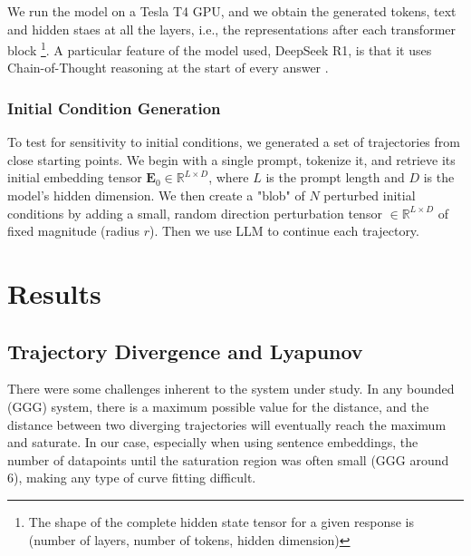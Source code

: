 \documentclass[a4paper,12pt]{article}
\begin{document}
We run the model on a Tesla T4 GPU, and we obtain the generated tokens, text and hidden staes at all the layers, i.e., the representations after each transformer block \footnote{The shape of the complete hidden state tensor for a given response is (number of layers, number of tokens, hidden dimension)}. A particular feature of the model used, DeepSeek R1, is that it uses Chain-of-Thought reasoning at the start of every answer \cite{deepseekR1}.

\subsubsection{Initial Condition Generation}
\label{subsec:init_cond_gen}
To test for sensitivity to initial conditions, we generated a set of trajectories from close starting points. We begin with a single prompt, tokenize it, and retrieve its initial embedding tensor $\mathbf{E}_0 \in \mathbb{R}^{L \times D}$, where $L$ is the prompt length and $D$ is the model's hidden dimension. We then create a "blob" of $N$ perturbed initial conditions by adding a small, random direction perturbation tensor $\in \mathbb{R}^{L \times D}$ of fixed magnitude (radius $r$). Then we use LLM to continue each trajectory.

\section{Results}
\label{sec:results}

\subsection{Trajectory Divergence and Lyapunov} \label{res:lyapunov} %

There were some challenges inherent to the system under study. In any bounded (GGG) system, there is a maximum possible value for the distance, and the distance between two diverging trajectories will eventually reach the maximum and saturate. In our case, especially when using sentence embeddings, the number of datapoints until the saturation region was often small (GGG around 6), making any type of curve fitting difficult.
\end{document}
